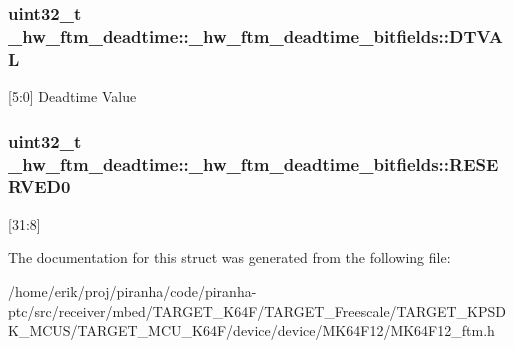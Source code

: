 \subsubsection[{\texorpdfstring{D\+T\+V\+AL}{DTVAL}}]{\setlength{\rightskip}{0pt plus 5cm}uint32\+\_\+t \+\_\+hw\+\_\+ftm\+\_\+deadtime\+::\+\_\+hw\+\_\+ftm\+\_\+deadtime\+\_\+bitfields\+::\+D\+T\+V\+AL}\hypertarget{struct__hw__ftm__deadtime_1_1__hw__ftm__deadtime__bitfields_a3aa0e5135bb033686013bb278ebae39a}{}\label{struct__hw__ftm__deadtime_1_1__hw__ftm__deadtime__bitfields_a3aa0e5135bb033686013bb278ebae39a}
\mbox{[}5\+:0\mbox{]} Deadtime Value 
\subsubsection[{\texorpdfstring{R\+E\+S\+E\+R\+V\+E\+D0}{RESERVED0}}]{\setlength{\rightskip}{0pt plus 5cm}uint32\+\_\+t \+\_\+hw\+\_\+ftm\+\_\+deadtime\+::\+\_\+hw\+\_\+ftm\+\_\+deadtime\+\_\+bitfields\+::\+R\+E\+S\+E\+R\+V\+E\+D0}\hypertarget{struct__hw__ftm__deadtime_1_1__hw__ftm__deadtime__bitfields_a18b2f7740ef81a3ffeb9c78e04894519}{}\label{struct__hw__ftm__deadtime_1_1__hw__ftm__deadtime__bitfields_a18b2f7740ef81a3ffeb9c78e04894519}
\mbox{[}31\+:8\mbox{]} 

The documentation for this struct was generated from the following file\+:\begin{DoxyCompactItemize}
\item 
/home/erik/proj/piranha/code/piranha-\/ptc/src/receiver/mbed/\+T\+A\+R\+G\+E\+T\+\_\+\+K64\+F/\+T\+A\+R\+G\+E\+T\+\_\+\+Freescale/\+T\+A\+R\+G\+E\+T\+\_\+\+K\+P\+S\+D\+K\+\_\+\+M\+C\+U\+S/\+T\+A\+R\+G\+E\+T\+\_\+\+M\+C\+U\+\_\+\+K64\+F/device/device/\+M\+K64\+F12/M\+K64\+F12\+\_\+ftm.\+h\end{DoxyCompactItemize}
